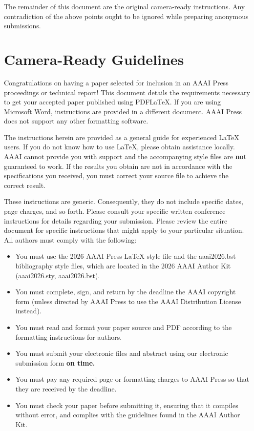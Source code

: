 The remainder of this document are the original camera-ready
instructions. Any contradiction of the above points ought to be ignored
while preparing anonymous submissions.

\section{Camera-Ready Guidelines}\label{camera-ready-guidelines}

Congratulations on having a paper selected for inclusion in an AAAI
Press proceedings or technical report! This document details the
requirements necessary to get your accepted paper published using
PDF{\LaTeX}. If you are using Microsoft Word, instructions are provided
in a different document. AAAI Press does not support any other
formatting software.

The instructions herein are provided as a general guide for experienced
{\LaTeX} users. If you do not know how to use {\LaTeX}, please obtain
assistance locally. AAAI cannot provide you with support and the
accompanying style files are \textbf{not} guaranteed to work. If the
results you obtain are not in accordance with the specifications you
received, you must correct your source file to achieve the correct
result.

These instructions are generic. Consequently, they do not include
specific dates, page charges, and so forth. Please consult your specific
written conference instructions for details regarding your submission.
Please review the entire document for specific instructions that might
apply to your particular situation. All authors must comply with the
following:

\begin{itemize}
\tightlist
\item
  You must use the 2026 AAAI Press {\LaTeX} style file and the
  aaai2026.bst bibliography style files, which are located in the 2026
  AAAI Author Kit (aaai2026.sty, aaai2026.bst).
\item
  You must complete, sign, and return by the deadline the AAAI copyright
  form (unless directed by AAAI Press to use the AAAI Distribution
  License instead).
\item
  You must read and format your paper source and PDF according to the
  formatting instructions for authors.
\item
  You must submit your electronic files and abstract using our
  electronic submission form \textbf{on time.}
\item
  You must pay any required page or formatting charges to AAAI Press so
  that they are received by the deadline.
\item
  You must check your paper before submitting it, ensuring that it
  compiles without error, and complies with the guidelines found in the
  AAAI Author Kit.
\end{itemize}


